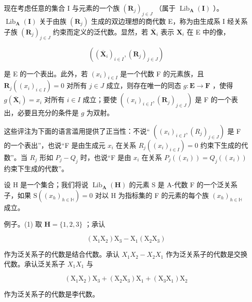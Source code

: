 现在考虑任意的集合 I 与元素的一个族 \((\mathbf{R}_j)_{j\in J}\) （属于 \(\operatorname{Lib}_{\mathbf{A}}(\mathbf{I})\) ）。 \(\operatorname{Lib}_{\mathbf{A}}(\mathbf{I})\) 关于由族 \((\mathbf{R}_j)\) 生成的双边理想的商代数 E，称为由生成系 I 经关系子族 \((\mathbf{R}_j)_{j\in J}\) 约束而定义的泛代数。显然，若 \(\overline{\mathbf{X}}_i\) 表示 \(\mathbf{X}_i\) 在 E 中的像，

\[
\left(\left(\overline {{\mathbf {X}}} _ {i}\right) _ {i \in I}, \left(\mathbf {R} _ {j}\right) _ {j \in J}\right)
\]

是 E 的一个表出。此外，若 \((x_{i})_{i\in I}\) 是一个代数 F 的元素族，且 \(\mathbf{R}_j((x_i)_{i\in I}) = 0\) 对所有 \(j\in J\) 成立，则存在唯一的同态 \(g:\mathbf{E}\to \mathbf{F}\) ，使得 \(g(\overline{\mathbf{X}}_i) = x_i\) 对所有 \(i\in I\) 成立；要使 \(((x_i)_{i\in I},(\mathbf{R}_j)_{j\in J})\) 是 F 的一个表出，必要且充分的条件是 \(g\) 为双射。

这些评注为下面的语言滥用提供了正当性：不说“ \(((x_i)_{i \in I}, (R_j)_{j \in J})\) 是 F 的一个表出”，也说“F 是由生成元 \(x_i\) 在关系 \(R_j((x_i)_{i \in I}) = 0\) 约束下生成的代数”。当 \(R_j\) 形如 \(P_j - Q_j\) 时，也说“F 是由 \(x_i\) 在关系 \(P_j((x_i)) = Q_j((x_i))\) 约束下生成的代数”。

设 H 是一个集合；我们将说 \(\operatorname{Lib}_{\mathbf{A}}(\mathbf{H})\) 的元素 S 是 A-代数 F 的一个泛关系子，如果 \(\mathrm{S}((x_{h})_{h\in\mathbb{H}})=0\) 对以 H 为指标集的 F 的元素的每个族 \((x_{h})_{h\in\mathbb{H}}\) 成立。

例子。(1) 取 \(\mathbf{H} = \{1,2,3\}\) ；承认

\[
(\mathrm{X} _ {1} \mathrm{X} _ {2}) \mathrm{X} _ {3} - \mathrm{X} _ {1} (\mathrm{X} _ {2} \mathrm{X} _ {3})
\]

作为泛关系子的代数是结合代数。承认 \(X_{1}X_{2}-X_{2}X_{1}\) 作为泛关系子的代数是交换代数。承认泛关系子 \(X_{1}X_{1}\) 与

\[
(\mathrm{X} _ {1} \mathrm{X} _ {2}) \mathrm{X} _ {3} + (\mathrm{X} _ {2} \mathrm{X} _ {3}) \mathrm{X} _ {1} + (\mathrm{X} _ {3} \mathrm{X} _ {1}) \mathrm{X} _ {2}
\]

作为泛关系子的代数是李代数。

